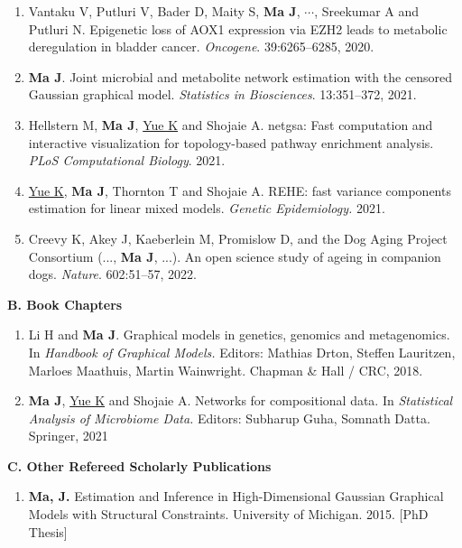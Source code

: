 \documentclass[10pt]{article}
\begin{document}
\begin{enumerate}
 \item Vantaku V, Putluri V, Bader D, Maity S, \textbf{Ma J}, $\cdots$, Sreekumar A and Putluri N. Epigenetic loss of AOX1 expression via EZH2 leads to metabolic deregulation in bladder cancer. {\em Oncogene}. 39:6265--6285, 2020.   
 \item \textbf{Ma J}. Joint microbial and metabolite network estimation with the censored Gaussian graphical model. {\em Statistics in Biosciences}. 13:351--372, 2021.
\item Hellstern M, \textbf{Ma J}, \underline{Yue K} and Shojaie A. netgsa: Fast computation and interactive visualization for topology-based pathway enrichment analysis. {\it PLoS Computational Biology}. 2021.
\item \underline{Yue K}, \textbf{Ma J}, Thornton T and Shojaie A. REHE: fast variance components estimation for linear mixed models. {\it Genetic Epidemiology.} 2021. 
\item Creevy K, Akey J, Kaeberlein M, Promislow D, and the Dog Aging Project Consortium (..., \textbf{Ma J}, ...). An open science study of ageing in companion dogs. {\it Nature}. 602:51--57, 2022.
\end{enumerate}

\textbf{B. Book Chapters}
\begin{enumerate}
\item Li H and \textbf{Ma J}. Graphical models in genetics, genomics and metagenomics. In {\em Handbook of Graphical Models.} Editors: Mathias Drton, Steffen Lauritzen, Marloes Maathuis, Martin Wainwright. Chapman \& Hall / CRC, 2018.
\item \textbf{Ma J}, \underline{Yue K} and Shojaie A. Networks for compositional data. In \emph{Statistical Analysis of Microbiome Data.} Editors: Subharup Guha, Somnath Datta. Springer, 2021
\end{enumerate}

\textbf{C. Other Refereed Scholarly Publications}
\begin{enumerate}
\item \textbf{Ma, J.} Estimation and Inference in High-Dimensional Gaussian Graphical Models  with Structural Constraints. University of Michigan. 2015. [PhD Thesis]
\end{enumerate}
\end{document}
